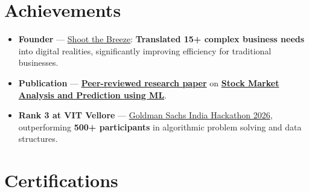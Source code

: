 \documentclass[a4paper,11pt]{article}
\newcommand{\ulink}[2]{\href{#1}{#2}}
\begin{document}
\section{Achievements}
\vspace{2pt}

\begin{itemize}[nosep, leftmargin=1.5em, itemsep=2pt, topsep=2pt]
  \item {\color[HTML]{0A0A0A}\fontsize{11}{14}\selectfont \textbf{Founder} --- \ulink{https://shoot-the-breeze.vercel.app}{Shoot the Breeze}: \textbf{Translated 15+ complex business needs} into digital realities, significantly improving efficiency for traditional businesses.}
  \item {\color[HTML]{0A0A0A}\fontsize{11}{14}\selectfont \textbf{Publication} --- \ulink{https://www.elruha.org/_files/ugd/614b1f_6b95e1b697bf452b9907ba46e0151c05.pdf\#page=774}{\textbf{Peer-reviewed research paper}} on \ulink{https://github.com/su-jin1425/Set-Project}{\textbf{Stock Market Analysis and Prediction using ML}}.}
  \item {\color[HTML]{0A0A0A}\fontsize{11}{14}\selectfont \textbf{Rank 3 at VIT Vellore} --- \ulink{https://www.hackerrank.com/contests/goldman-sachs-india-hackathon-2026-cs/leaderboard}{Goldman Sachs India Hackathon 2026}, outperforming \textbf{500+ participants} in algorithmic problem solving and data structures.}
\end{itemize}

\section{Certifications}
\vspace{2pt}
\end{document}
